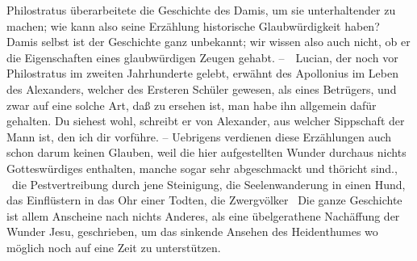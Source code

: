 \begin{aufza}
\item Philostratus überarbeitete die Geschichte des Damis, um sie unterhaltender zu machen; wie kann also seine Erzählung historische Glaubwürdigkeit haben? Damis selbst ist der Geschichte ganz unbekannt; wir wissen also auch nicht, ob er die Eigenschaften eines glaubwürdigen Zeugen gehabt. --~\ Lucian, der noch vor Philostratus im zweiten Jahrhunderte gelebt, erwähnt des Apollonius im Leben des Alexanders, welcher des Ersteren Schüler gewesen, als eines Betrügers, und zwar auf eine solche Art, daß zu ersehen ist, man habe ihn allgemein dafür gehalten. Du siehest wohl, schreibt er von Alexander, aus welcher Sippschaft der Mann ist, den ich dir vorführe. -- Uebrigens verdienen diese Erzählungen auch schon darum keinen Glauben, weil die hier aufgestellten Wunder durchaus nichts Gotteswürdiges enthalten, manche sogar sehr abgeschmackt und thöricht sind., \zB\ die Pestvertreibung durch jene Steinigung, die Seelenwanderung in einen Hund, das Einflüstern in das Ohr einer Todten, die Zwergvölker \usw\ Die ganze Geschichte ist allem Anscheine nach nichts Anderes, als eine übelgerathene Nachäffung der Wunder Jesu, geschrieben, um das sinkende Ansehen des Heidenthumes wo möglich noch auf eine Zeit zu unterstützen.
\end{aufza}

